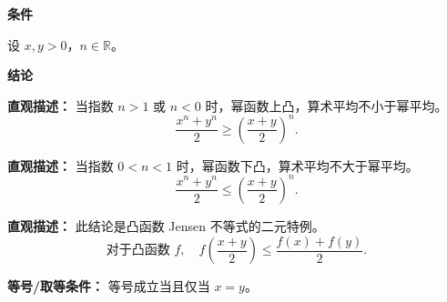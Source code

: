 \begin{statementbox}

\textbf{\textcolor{CStatement}{条件}}
\begin{description}[style=nextline, leftmargin=2.8em, labelsep=0.5em, itemsep=0.35em]
    \item[\textbf{\textcolor{CStatement}{条件 1（正实数变量）：}}] 设 $x, y > 0$，$n \in \mathbb{R}$。
\end{description}

\textbf{\textcolor{CStatement}{结论}}
\begin{description}[style=nextline, leftmargin=2.8em, labelsep=0.5em, itemsep=0.45em]
    \item[\textbf{\textcolor{CStatement}{结论一（指数外凸）：}}]
    \textbf{\textcolor{CStatement}{直观描述：}} 当指数 $n>1$ 或 $n<0$ 时，幂函数上凸，算术平均不小于幂平均。
    \[
    \frac{x^{n} + y^{n}}{2} \geq \left(\frac{x+y}{2}\right)^{n}.
    \]

    \item[\textbf{\textcolor{CStatement}{结论二（指数内凹）：}}]
    \textbf{\textcolor{CStatement}{直观描述：}} 当指数 $0 < n < 1$ 时，幂函数下凸，算术平均不大于幂平均。
    \[
    \frac{x^{n} + y^{n}}{2} \leq \left(\frac{x+y}{2}\right)^{n}.
    \]

    \item[\textbf{\textcolor{CStatement}{推广结论（Jensen特例）：}}]
    \textbf{\textcolor{CStatement}{直观描述：}} 此结论是凸函数 Jensen 不等式的二元特例。
    \[
    \text{对于凸函数 } f, \quad f\!\left(\frac{x+y}{2}\right) \le \frac{f(x)+f(y)}{2}.
    \]
\end{description}

\textbf{\textcolor{CStatement}{等号/取等条件：}} 等号成立当且仅当 $x = y$。

\end{statementbox}
